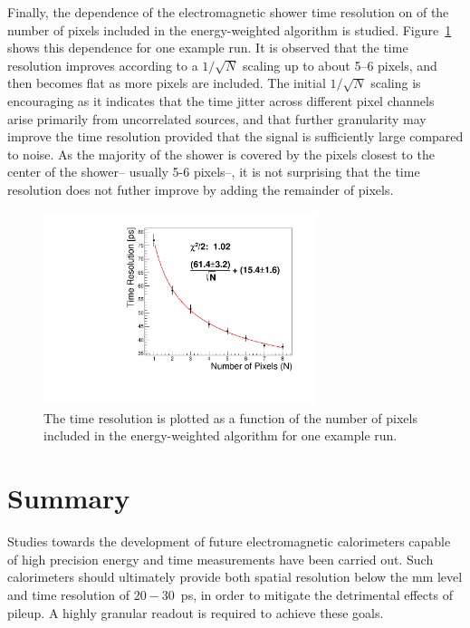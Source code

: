 Finally, the dependence of the electromagnetic shower time resolution
on of the number of pixels included in the energy-weighted algorithm
is studied.
Figure~\ref{fig:sqrtN} shows this dependence for one example run. It
is observed
that the time resolution improves according to a $1/\sqrt{N}$ scaling up to
about 5--6 pixels, and then becomes flat as more pixels are included. The
initial $1/\sqrt{N}$ scaling is encouraging as it indicates that the time jitter across
different pixel channels arise primarily from uncorrelated sources, and that
further granularity may improve the time resolution provided that the signal is
sufficiently large compared to noise. As the majority of the shower is
covered by the pixels closest to the center of the shower-- usually
5-6 pixels--, it is not surprising
that the time resolution does not futher improve by adding the
remainder of pixels.

\begin{figure}[h]
  \centering
  \includegraphics[width=8cm]{Images/sqrtN/t1065_run_38_Dt_IWP.pdf}
  \caption{ The time resolution is plotted as a function of the number of pixels
    included in the energy-weighted algorithm for one example run. }
  \label{fig:sqrtN}
\end{figure}

\section{Summary}
Studies towards the development of future electromagnetic 
calorimeters capable of high precision energy and time measurements
have been carried out.
Such calorimeters should ultimately provide both spatial resolution below the $\mathrm{mm}$
level and time resolution of $20-30$~ps, in order to mitigate the detrimental effects
of pileup. A highly granular readout is required to achieve these goals. 


